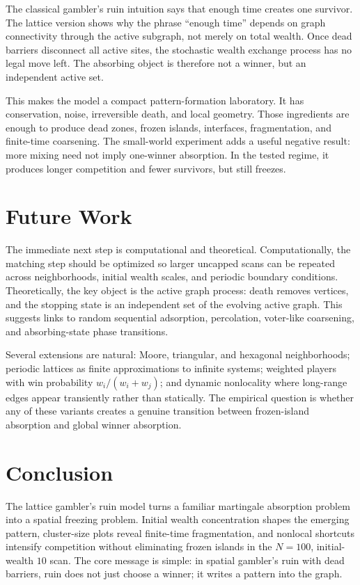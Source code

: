 \documentclass[11pt]{article}
\begin{document}
The classical gambler's ruin intuition says that enough time creates one survivor. The lattice version shows why the phrase ``enough time'' depends on graph connectivity through the active subgraph, not merely on total wealth. Once dead barriers disconnect all active sites, the stochastic wealth exchange process has no legal move left. The absorbing object is therefore not a winner, but an independent active set.

This makes the model a compact pattern-formation laboratory. It has conservation, noise, irreversible death, and local geometry. Those ingredients are enough to produce dead zones, frozen islands, interfaces, fragmentation, and finite-time coarsening. The small-world experiment adds a useful negative result: more mixing need not imply one-winner absorption. In the tested regime, it produces longer competition and fewer survivors, but still freezes.

\section{Future Work}

The immediate next step is computational and theoretical. Computationally, the matching step should be optimized so larger uncapped scans can be repeated across neighborhoods, initial wealth scales, and periodic boundary conditions. Theoretically, the key object is the active graph process: death removes vertices, and the stopping state is an independent set of the evolving active graph. This suggests links to random sequential adsorption, percolation, voter-like coarsening, and absorbing-state phase transitions.

Several extensions are natural: Moore, triangular, and hexagonal neighborhoods; periodic lattices as finite approximations to infinite systems; weighted players with win probability $w_i/(w_i+w_j)$; and dynamic nonlocality where long-range edges appear transiently rather than statically. The empirical question is whether any of these variants creates a genuine transition between frozen-island absorption and global winner absorption.

\section{Conclusion}

The lattice gambler's ruin model turns a familiar martingale absorption problem into a spatial freezing problem. Initial wealth concentration shapes the emerging pattern, cluster-size plots reveal finite-time fragmentation, and nonlocal shortcuts intensify competition without eliminating frozen islands in the $N=100$, initial-wealth $10$ scan. The core message is simple: in spatial gambler's ruin with dead barriers, ruin does not just choose a winner; it writes a pattern into the graph.
\end{document}
